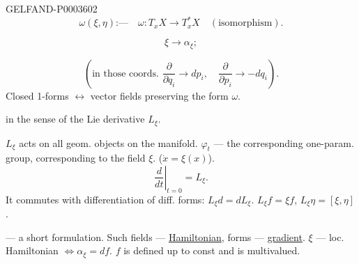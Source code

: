 \begin{GelfandAdjacentEvidence}{GELFAND-P000360}{2}
\begin{equation*}\omega (\xi,\eta)\text{:---}\quad\omega: T_xX\to T_x^*X\quad (\text{isomorphism}).\end{equation*}
\end{GelfandAdjacentEvidence}

\begin{equation*}\xi\to\alpha_\xi;\end{equation*}
\begin{center}\end{center}



\begin{equation*}\left (\text{in those coords. }\frac{\partial}{\partial q_i}\to dp_i,\quad\frac{\partial}{\partial p_i}\to-dq_i\right).\end{equation*}
Closed 1-forms $\leftrightarrow$ vector fields preserving the form $\omega$.
\begin{flushright}in the sense of the Lie derivative $L_\xi$.\end{flushright}
$L_\xi$ acts on all geom. objects on the manifold.
$\varphi_t$ --- the corresponding one-param. group, corresponding to the field $\xi$. ($\dot x=\xi (x)$).
\begin{equation*}\left.\frac d{dt}\right|_{t=0}=L_\xi.\end{equation*}
It commutes with differentiation of diff. forms: $L_\xi d=dL_\xi$.
$L_\xi f=\xi f$, $L_\xi\eta=[\xi,\eta]$.
\begin{center}\end{center}



--- a short formulation.
Such fields --- \uline{Hamiltonian}, forms --- \uline{gradient}.
$\xi$ --- loc. Hamiltonian $\Leftrightarrow\alpha_\xi=df$.
$f$ is defined up to const and is multivalued.



